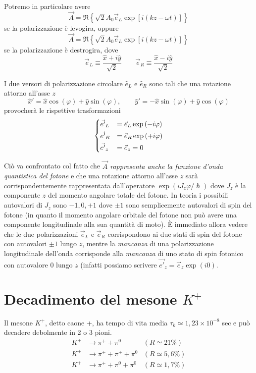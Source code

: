 Potremo in particolare avere
\[
  \vec{A} = \Re\left\{ \sqrt{2}A_0 \vec{e}_L \exp\left[ i\left( kz-\omega t \right) \right] \right\}
\]
se la polarizzazione è levogira, oppure
\[
  \vec{A} = \Re\left\{ \sqrt{2}A_0 \vec{e}_L \exp\left[ i\left( kz-\omega t \right) \right] \right\}
\]
se la polarizzazione è destrogira, dove
\[
  \vec{e}_L \equiv \frac{\hat{x} + i\hat{y}}{\sqrt{2}}\qquad\vec{e}_R \equiv \frac{\hat{x} - i\hat{y}}{\sqrt{2}}
\]

I due versori di polarizzazione circolare $\hat{e}_L$ e $\hat{e}_R$ sono tali
che una rotazione attorno all'asse $z$
\[
  \hat{x}'=\hat{x}\cos(\varphi) + \hat{y}\sin\left( \varphi \right),\qquad
  \hat{y}'=-\hat{x}\sin\left( \varphi \right) + \hat{y}\cos\left( \varphi
  \right)
\]
provocherà le rispettive trasformazioni
\begin{equation}
  \begin{dcases}
	\vec{e'}_L&=\vec{e}_L\exp\left( -i\varphi \right)\\
	\vec{e'}_R&=\vec{e}_R\exp\left( +i\varphi \right)\\
    \vec{e'}_z&=\vec{e}_z = 0
  \end{dcases}
\end{equation}

Ciò va confrontato col fatto che \textit{$\vec{A}$ rappresenta anche la funzione
d'onda quantistica del fotone} e che una rotazione attorno all'asse $z$ sarà
corrispondentemente rappresentata dall'operatore $\exp\left( iJ_z\varphi/\hslash
\right)$ dove $J_z$ è la componente $z$ del momento angolare totale del fotone.
In teoria i possibili autovalori di $J_z$ sono $-1,0,+1$ dove $\pm1$ sono
semplicemente autovalori di spin del fotone (in quanto il momento angolare
orbitale del fotone non può avere una componente longitudinale alla sua quantità
di moto). È immediato allora vedere che le due polarizzazioni $\vec{e}_L$ e
$\vec{e}_R$ corrispondono ai due stati di spin del fotone con autovalori $\pm1$
lungo $z$, mentre la \textit{mancanza} di una polarizzazione longitudinale
dell'onda corrisponde alla \textit{mancanza} di uno stato di spin fotonico con
autovalore $0$ lungo $z$ (infatti possiamo scrivere $\vec{e'}_z =
\vec{e}_z\exp\left( i0 \right)$.
\section[Decadimento del caone +]{Decadimento del mesone $K^+$}
\label{ch:mesonek}
Il mesone $K^+$, detto caone +, ha tempo di vita media
$\tau_k\simeq1,23\times10^{-8}$ sec e può decadere debolmente in 2 o 3 pioni.
\begin{align}
  K^+ &\rightarrow \pi^+ + \pi^0         & (R \simeq 21\%)\label{eq:a1}\\
  K^+ &\rightarrow \pi^+ + \pi^+ + \pi^0 & (R \simeq 5,6\%)\\
  K^+ &\rightarrow \pi^+ + \pi^0 + \pi^0 & (R \simeq 1,7\%)
\end{align}

